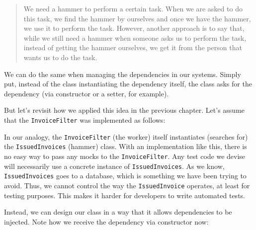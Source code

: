 \begin{quote}
We need a hammer to perform a certain task. When we are asked to do this
task, we find the hammer by ourselves and once we have the hammer, we
use it to perform the task. However, another approach is to say that,
while we still need a hammer when someone asks us to perform the task,
instead of getting the hammer ourselves, we get it from the person that
wants us to do the task.
\end{quote}

We can do the same when managing the dependencies in our systems. Simply
put, instead of the class instantiating the dependency itself, the class
asks for the dependency (via constructor or a setter, for example).

But let's revisit how we applied this idea in the previous chapter.
Let's assume that the \texttt{InvoiceFilter} was implemented as follows:

\begin{Shaded}
\begin{Highlighting}[]
 
 
    \NormalTok{() \{}
 \NormalTok{();}
 
\NormalTok{  \}}
 
\NormalTok{\}}
\end{Highlighting}
\end{Shaded}

In our analogy, the \texttt{InvoiceFilter} (the worker) itself
instantiates (searches for) the \texttt{IssuedInvoices} (hammer) class.
With an implementation like this, there is no easy way to pass any mocks
to the \texttt{InvoiceFilter}. Any test code we devise will necessarily
use a concrete instance of \texttt{IssuedInvoices}. As we know,
\texttt{IssuedInvoices} goes to a database, which is something we have
been trying to avoid. Thus, we cannot control the way the
\texttt{IssuedInvoice} operates, at least for testing purposes. This
makes it harder for developers to write automated tests.

Instead, we can design our class in a way that it allows dependencies to
be injected. Note how we receive the dependency via constructor now:

\begin{Shaded}
\begin{Highlighting}[]
 
 
   
 
   
\NormalTok{  \}}
 
    \NormalTok{() \{}
\NormalTok{  \}}
\NormalTok{\}}
\end{Highlighting}
\end{Shaded}


